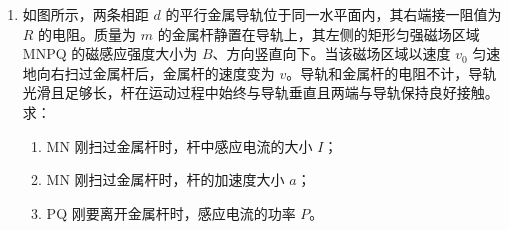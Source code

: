 \documentclass[\gkver]{gaokaozhenti}
\begin{document}
\begin{enumerate}
{（2）由 $p = \sqrt{2mE_{k}}$ 可知，动能相同时，质子的质量比 $\alpha$ 粒子的质量小，因此动量小；由 $\lambda = \frac{h}{p}$ 可知，质子和 $\alpha$ 粒子的德布罗意波波长之比为 $\frac{\lambda_{\text{p}}}{\lambda_{\alpha}} = \sqrt{\frac{m_{\alpha}}{m_{\text{p}}}} = \sqrt{\frac{4}{1}} = \frac{2}{1}$。

（3）由动量守恒得 $m_{1}v_{1} - m_{2}v_{2} = m_{2}v_{2}' - m_{1}v_{1}'$，解得 $\frac{m_{1}}{m_{2}} = \frac{v_{2} + v_{2}'}{v_{1} + v_{1}'}$，代入数据得 $\frac{m_{1}}{m_{2}} = \frac{3}{2}$。
}

\item
如图所示，两条相距 $d$ 的平行金属导轨位于同一水平面内，其右端接一阻值为 $R$ 的电阻。质量为 $m$ 的金属杆静置在导轨上，其左侧的矩形匀强磁场区域 MNPQ 的磁感应强度大小为 $B$、方向竖直向下。当该磁场区域以速度 $v_{0}$ 匀速地向右扫过金属杆后，金属杆的速度变为 $v$。导轨和金属杆的电阻不计，导轨光滑且足够长，杆在运动过程中始终与导轨垂直且两端与导轨保持良好接触。求：

\begin{enumerate}
	\item
	MN 刚扫过金属杆时，杆中感应电流的大小 $I$；
	\item
	MN 刚扫过金属杆时，杆的加速度大小 $a$；
	\item
	PQ 刚要离开金属杆时，感应电流的功率 $P$。
\end{enumerate}

\onepicture[align=right, w=8.35cm]{}



\end{enumerate}
\end{document}
